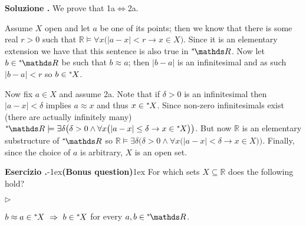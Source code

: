 \documentclass[10pt]{article}
\def\RR{\mathds R}
\def\imp{\rightarrow}
\def\IMP{\Rightarrow}
\def\IFF{\Leftrightarrow}
\newcommand{\labella}[1]{{\sf\footnotesize #1}\hfill}
\renewenvironment{itemize}
  {\begin{list}{$\triangleright$}{%
   \setlength{\parskip}{0mm}
   \setlength{\topsep}{0mm}
   \setlength{\rightmargin}{0mm}
   \setlength{\listparindent}{0mm}
   \setlength{\itemindent}{0mm}
   \setlength{\labelwidth}{3ex}
   \setlength{\itemsep}{0mm}
   \setlength{\parsep}{0mm}
   \setlength{\partopsep}{0mm}
   \setlength{\labelsep}{1ex}
   \setlength{\leftmargin}{\labelwidth+\labelsep}
   \let\makelabel\labella}}{%
   \end{list}}
\newcounter{ex}
\newenvironment{exercise}{\clearpage\addtocounter{ex}{1}\textbf{Esercizio \theex.\quad}}{}
\newcounter{sol}
\newenvironment{solution}{\addtocounter{sol}{1}\textbf{Soluzione \theex.\quad}}{}
\def\nsR{{}^*\kern-.2ex\RR}
\def\ns{{}^*\kern-.2ex}
\def\ssf#1{\textsf{#1}}
\begin{document}
\begin{solution}
  We prove that \ssf{1a}\(\IFF\)\ssf{2a}.

  Assume \(X\) open and let \(a\) be one of its points; then we know that there is some real \(r>0\) such that \(\RR\models\forall x \big(|a - x| < r \imp x \in X\big)\).
  Since it is an elementary extension we have that this sentence is also true in \(\nsR\).
  Now let \(b\in\nsR\) be such that \(b\approx a\); then \(|b - a|\) is an infinitesimal and as such \(|b - a| < r\) so \(b\in \ns X\).

  Now fix \(a\in X\) and assume \ssf{2a}.
  Note that if \(\delta>0\) is an infinitesimal then \(|a-x| < \delta\) implies \(a\approx x\) and thus \(x\in \ns X\).
  Since non-zero infinitesimals exist (there are actually infinitely many) \(\nsR\models\exists\delta\big(\delta>0 \land \forall x\big(|a - x|\leq\delta \imp x\in\ns X\big)\big)\).
  But now \(\RR\) is an elementary substructure of \(\nsR\) so \(\RR\models\exists\delta\big(\delta>0 \land \forall x\big(|a-x| < \delta \imp x\in X\big)\big)\).
  Finally, since the choice of \(a\) is arbitrary, \(X\) is an open set.
\end{solution}

\begin{exercise}\kern-1ex\textbf{(Bonus question)}\kern1ex
  For which sets $X \subseteq \RR$ does the following hold?
  \begin{itemize}
  \item[2.] $b\approx a\in\ns X \ \IMP\ b\in\ns X$ for every $a,b\in\nsR$.
  \end{itemize}
\end{exercise}
\end{document}
